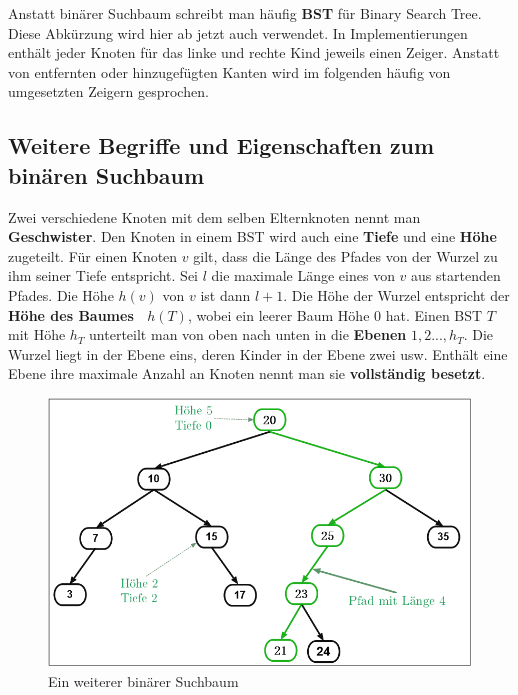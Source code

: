 \documentclass[a4paper,12pt]{article}
\begin{document}
\noindent Anstatt binärer Suchbaum schreibt man häufig \textbf{BST} für Binary Search Tree. Diese Abkürzung wird hier ab jetzt auch verwendet. In Implementierungen enthält jeder Knoten für das linke und rechte Kind jeweils einen Zeiger. Anstatt von entfernten oder hinzugefügten Kanten wird im folgenden häufig von umgesetzten Zeigern gesprochen. 	
\subsection{Weitere Begriffe und Eigenschaften zum binären Suchbaum}	
\noindent Zwei verschiedene Knoten mit dem selben Elternknoten nennt man \textbf{Geschwister}. Den Knoten in einem BST wird auch eine \textbf{Tiefe} und eine \textbf{Höhe} zugeteilt. Für einen Knoten $v$ gilt, dass die Länge des Pfades von der Wurzel zu ihm seiner Tiefe entspricht. Sei $l$ die maximale Länge eines von $v$ aus startenden Pfades. Die Höhe $\mathit{h(v)}$ von $v$ ist dann $l+1$. Die Höhe der Wurzel entspricht der \textbf{Höhe des Baumes~ $h(T)$}, wobei ein leerer Baum Höhe $0$ hat. Einen BST $T$ mit Höhe $h_T$ unterteilt man von oben nach unten in die \textbf{Ebenen} $\mathit{1,2...,h_T}$. Die Wurzel liegt in der Ebene eins, deren Kinder in der Ebene zwei usw. Enthält eine Ebene ihre maximale Anzahl an Knoten nennt man sie \textbf{vollständig besetzt}.
\begin{figure}[h]
	\centering
	\includegraphics[width= 1\textwidth]{"Medien/Einleitung/suchbaum2_2"}
	\caption{Ein weiterer binärer Suchbaum }
	\label{fig:suchbaum2_2}
\end{figure}
\end{document}
